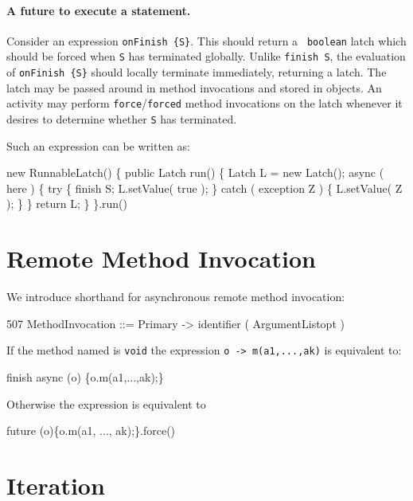 {{

\paragraph{A future to execute a statement.}
Consider an expression {\tt onFinish \{S\}}. This should return a {\tt
boolean} latch which should be forced when {\tt S} has terminated
globally. Unlike {\tt finish S}, the evaluation of {\tt onFinish
\{S\}} should locally terminate immediately, returning a latch. The
latch may be passed around in method invocations and stored in
objects. An activity may perform {\tt force}/{\tt forced} method
invocations on the latch whenever it desires to determine whether {\tt S}
has terminated.

Such an expression can be written as:
\begin{x10}
  new RunnableLatch() \{
      public Latch run() \{
         Latch L = new Latch();
         async ( here ) \{
            try \{
                finish S;
                L.setValue( true );
            \} catch ( exception Z ) \{
                 L.setValue( Z );
            \}
         \}
         return L;
      \}
    \}.run()
\end{x10}

\section{Remote Method Invocation}
We introduce shorthand for asynchronous remote method invocation:

\begin{x10}
507   MethodInvocation ::= 
        Primary -> identifier ( ArgumentListopt )
\end{x10}

If the method named is {\tt void} the expression {\tt o -> m(a1,...,ak)}
is equivalent to:
\begin{x10}
 finish async (o) \{o.m(a1,...,ak);\}
\end{x10}

Otherwise the expression is equivalent to
\begin{x10}
 future (o)\{o.m(a1, ..., ak);\}.force()
\end{x10}

\section{Iteration}\label{ForLoop}
\label{ForAllLoop}

}}
